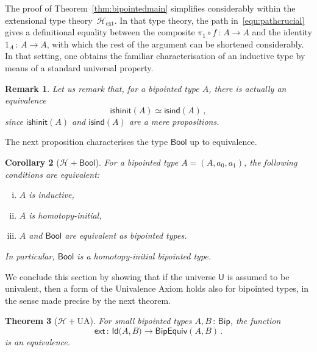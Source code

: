 \documentclass[10pt,a4paper,oneside,reqno]{amsart}
\theoremstyle{mythm}
\newtheorem{theorem}{Theorem}[section]
\newtheorem{corollary}[theorem]{Corollary}
\theoremstyle{mydef}
\theoremstyle{myrmk}
\newtheorem{remark}[theorem]{Remark}
\newcommand{\co}{\,{:}\,}
\newcommand{\Hint}{\mathcal{H}}
\newcommand{\Hext}{\mathcal{H}_{\mathrm{ext}}}
\newcommand{\isbipind}{\mathsf{isind}}
\newcommand{\isbiphinit}{\mathsf{ishinit}}
\newcommand{\ext}{\mathsf{ext}}
\newcommand{\Bool}{\mathsf{Bool}}
\newcommand{\Id}{\mathsf{Id}}
\newcommand{\U}{\mathsf{U}}
\newcommand{\Bip}{\mathsf{Bip}}
\newcommand{\BipEquiv}{\mathsf{BipEquiv}}
\begin{document}
The proof of Theorem~\ref{thm:bipointedmain} simplifies considerably within the extensional
type theory~$\Hext$. In that type theory, the path in~\eqref{equ:pathcrucial} gives a definitional equality 
between the composite $\pi_1 \circ f \co A \to A$ and the identity $1_A \co A \to A$, with which the
rest of the argument can be shortened considerably. In that setting, one obtains the familiar characterisation 
of an inductive type by means of a standard universal property.

\begin{remark} 
Let us remark that, for a bipointed type $A$, there is actually an equivalence  
\[
\isbiphinit(A) \simeq \isbipind(A) \, ,
\]
since $\isbiphinit(A)$ and $\isbipind(A)$ are a mere propositions. 
\end{remark} 

The next proposition characterises the
type $\Bool$ up to equivalence.



\begin{corollary}[$\Hint + \Bool$]  For a bipointed type $A = (A, a_0, a_1)$, the following 
conditions are equivalent:
\begin{enumerate}[(i)]
\item $A$ is inductive,
\item $A$ is homotopy-initial,
\item $A$ and $\Bool$ are equivalent as bipointed types.
\end{enumerate}
In particular, $\Bool$ is a homotopy-initial bipointed type.
\end{corollary}






We conclude this section by showing that if the universe $\U$ is assumed to be univalent, then a form of the Univalence Axiom holds also for bipointed types, in the sense made precise by the next theorem.


\begin{theorem}[$\Hint + \mathrm{UA}$] \label{thm:bipunivalence}
For small bipointed types $A, B \co \Bip$, the function
\[ 
\ext \co \Id \big(A,B\big) \to  \BipEquiv(A,B) \, .
\] 
is an equivalence.
\end{theorem} 
\end{document}
